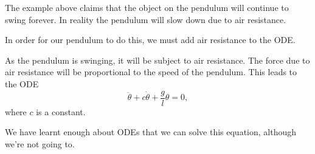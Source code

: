The example above claims that the object on the pendulum will continue to swing forever. In reality the pendulum will slow down due to air resistance.

In order for our pendulum to do this, we must add air resistance to the ODE.

\begin{example}
As the pendulum is swinging, it will be subject to air resistance. The force due to air resistance will be proportional to the speed of the pendulum.
This leads to the ODE \[\ddot\theta + c \dot\theta + \frac{g}{l}\theta = 0,\] where $c$ is a constant.
\end{example}

We have learnt enough about ODEs that we can solve this equation, although we're not going to.
